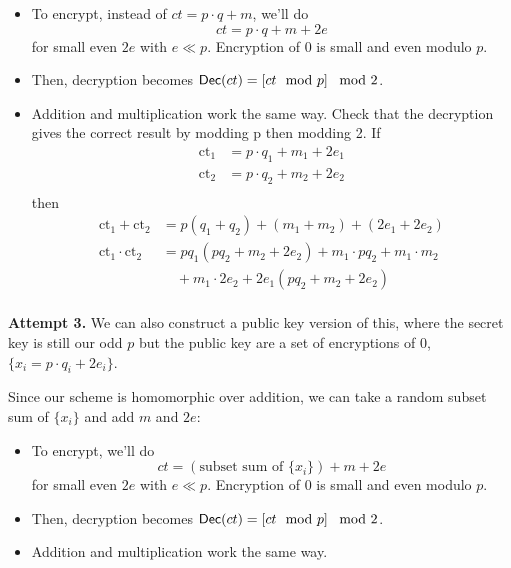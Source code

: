 \begin{itemize}
    \item To encrypt, instead of $ct = p\cdot q + m$, we'll do
          \[ct = p\cdot q + m + 2e\]
          for small even $2e$ with $e \ll p$. Encryption of $0$ is small and even modulo $p$.
    \item Then, decryption becomes $\operatorname{\mathsf{Dec}}(ct) = \left[ ct\mod p \right]\mod 2$.
    \item Addition and multiplication work the same way. Check that the decryption gives the correct result by modding p then modding 2. If
    \begin{align*}
        \text{ct}_1 &= p \cdot q_1 + m_1 + 2e_1 \\
        \text{ct}_2 &= p \cdot q_2 + m_2 + 2e_2 \\
    \end{align*}
    then
    \begin{align*}
        \text{ct}_1 + \text{ct}_2 &= p(q_1 + q_2) + (m_1 + m_2) + (2e_1 + 2e_2)\\
        \text{ct}_1 \cdot \text{ct}_2 &= pq_1(pq_2 + m_2 + 2e_2) + m_1 \cdot pq_2 + m_1 \cdot m_2\\
        & \quad + m_1 \cdot 2e_2 + 2e_1(pq_2 + m_2 + 2e_2)\\
    \end{align*}
\end{itemize}



\textbf{Attempt 3.} We can also construct a public key version of this, where the secret key is still our odd $p$ but the public key are a set of encryptions of $0$, $\{x_i = p\cdot q_i + 2e_i\}$.

Since our scheme is homomorphic over addition, we can take a random subset sum of $\{x_i\}$ and add $m$ and $2e$:
\begin{itemize}
    \item To encrypt, we'll do
          \[ct = (\text{subset sum of $\{x_i\}$}) + m + 2e\]
          for small even $2e$ with $e \ll p$. Encryption of $0$ is small and even modulo $p$.
    \item Then, decryption becomes $\operatorname{\mathsf{Dec}}(ct) = \left[ ct\mod p \right]\mod 2$.
    \item Addition and multiplication work the same way.
\end{itemize}

